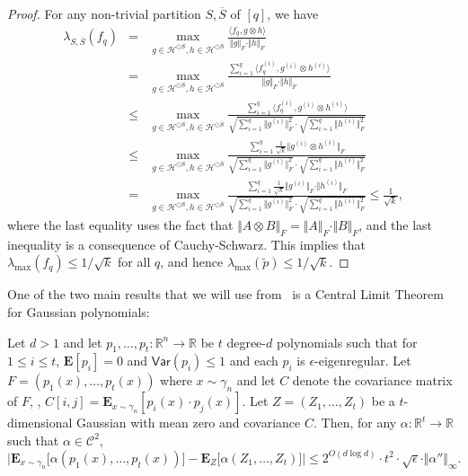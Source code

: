 \documentclass{toc}
\begin{document}
\begin{proof}
For any non-trivial partition $S, \overline{S}$ of $[q]$, we have
\begin{eqnarray*}
\lambda_{S, \overline{S}}(f_q) &=&  \max_{g \in \mathcal{H}^{\odot S}, h \in \mathcal{H}^{\odot \overline{S}}} \frac{\langle f_q , g \otimes h \rangle}{\Vert g \Vert_F \cdot \Vert h \Vert_F} \\
&=& \max_{g \in \mathcal{H}^{\odot S}, h \in \mathcal{H}^{\odot \overline{S}}} \frac{\sum_{i=1}^q \langle f_q^{(i)}, g^{(i)} \otimes h^{(i)} \rangle }{\Vert g \Vert_F \cdot \Vert h \Vert_F} \\
&\le& \max_{g \in \mathcal{H}^{\odot S}, h \in \mathcal{H}^{\odot \overline{S}}} \frac{\sum_{i=1}^q \langle f_q^{(i)}, g^{(i)} \otimes h^{(i)} \rangle }{ \sqrt{\sum_{i=1}^q \Vert g^{(i)} \Vert_F^2} \cdot  \sqrt{\sum_{i=1}^q \Vert h^{(i)} \Vert_F^2} } \\
 &\le& \max_{g \in \mathcal{H}^{\odot S}, h \in \mathcal{H}^{\odot \overline{S}}} \frac{\sum_{i=1}^q \frac{1}{\sqrt{k}} \Vert g^{(i)} \otimes h^{(i)} \Vert_F }{ \sqrt{\sum_{i=1}^q \Vert g^{(i)} \Vert_F^2} \cdot  \sqrt{\sum_{i=1}^q \Vert h^{(i)} \Vert_F^2} }\\
 &=& \max_{g \in \mathcal{H}^{\odot S}, h \in \mathcal{H}^{\odot \overline{S}}} \frac{\sum_{i=1}^q \frac{1}{\sqrt{k}} \Vert g^{(i)} \Vert_F \cdot \Vert  h^{(i)} \Vert_F }{ \sqrt{\sum_{i=1}^q \Vert g^{(i)} \Vert_F^2} \cdot  \sqrt{\sum_{i=1}^q \Vert h^{(i)} \Vert_F^2} } \le \frac{1}{\sqrt{k}},
\end{eqnarray*}
where the last equality uses the fact that $\Vert A \otimes B \Vert_F = \Vert A
\Vert_F \cdot \Vert B \Vert_F$, and the last inequality is a consequence of
Cauchy-Schwarz. This implies that $\lambda_{\max}(f_q) \le {1}/{\sqrt k}$ for all $q$,
and hence $\lambda_{\max}(\tilde p) \le {1}/{\sqrt k}$.
\end{proof}

One of the two main results that we will use from~\cite{DS14} is a Central Limit Theorem for Gaussian polynomials:

\begin{theorem}\label{thm:CLT}
Let $d >1$ and let $p_1, \ldots, p_t: \mathbb{R}^n \rightarrow \mathbb{R}$ be $t$ degree-$d$ polynomials such that for $1\le i \le t$, $\mathbf{E}[p_i]=0$ and $\mathsf{Var}(p_i) \le 1$ and each $p_i$ is $\epsilon$-eigenregular. Let $F = (p_1(x), \ldots, p_t(x))$ where $x \sim \gamma_n$ and let $C$ denote the covariance matrix of $F$, \ie, $C[i,j] = \mathbf{E}_{x \sim \gamma_n} [p_i(x) \cdot p_j(x)]$.  Let $Z= (Z_1, \ldots, Z_t)$ be a $t$-dimensional Gaussian with mean zero and covariance $C$. 
Then, for any $\alpha:\mathbb{R}^t \rightarrow \mathbb{R}$ such that $\alpha \in \mathcal{C}^2$, 
$$
\big| \mathbf{E}_{x \sim \gamma_n} \big[ \alpha(p_1(x), \ldots, p_t(x)) \big] - \mathbf{E}_{Z} \big[ \alpha(Z_1, \ldots, Z_t) \big] \big|  \le 2^{O( d \log d)} \cdot t^2 \cdot \sqrt{\epsilon} \cdot \Vert \alpha '' \Vert_{\infty}. 
$$
\end{theorem}
\end{document}
